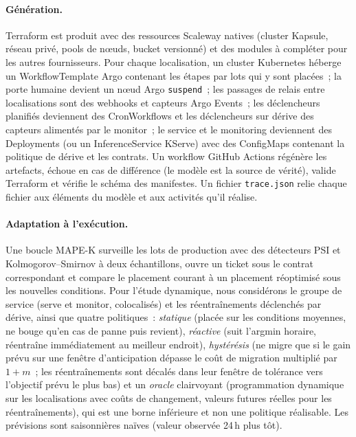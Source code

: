 \documentclass[10pt,a4paper]{article}
\begin{document}
\paragraph{Génération.} Terraform est produit avec des ressources Scaleway natives
(cluster Kapsule, réseau privé, pools de nœuds, bucket versionné) et des modules à
compléter pour les autres fournisseurs. Pour chaque localisation, un cluster
Kubernetes héberge un WorkflowTemplate Argo contenant les étapes par lots qui y sont
placées~; la porte humaine devient un nœud Argo \texttt{suspend}~; les passages de
relais entre localisations sont des webhooks et capteurs Argo Events~; les
déclencheurs planifiés deviennent des CronWorkflows et les déclencheurs sur dérive des
capteurs alimentés par le monitor~; le service et le monitoring deviennent des
Deployments (ou un InferenceService KServe) avec des ConfigMaps contenant la
politique de dérive et les contrats. Un workflow GitHub Actions régénère les
artefacts, échoue en cas de différence (le modèle est la source de vérité), valide
Terraform et vérifie le schéma des manifestes. Un fichier \texttt{trace.json} relie
chaque fichier aux éléments du modèle et aux activités qu'il réalise.

\paragraph{Adaptation à l'exécution.} Une boucle MAPE-K surveille les lots de
production avec des détecteurs PSI et Kolmogorov--Smirnov à deux échantillons, ouvre
un ticket sous le contrat correspondant et compare le placement courant à un placement
réoptimisé sous les nouvelles conditions. Pour l'étude dynamique, nous considérons le
groupe de service (serve et monitor, colocalisés) et les réentraînements déclenchés par
dérive, ainsi que quatre politiques~: \emph{statique} (placée sur les conditions
moyennes, ne bouge qu'en cas de panne puis revient), \emph{réactive} (suit l'argmin
horaire, réentraîne immédiatement au meilleur endroit), \emph{hystérésis} (ne migre que
si le gain prévu sur une fenêtre d'anticipation dépasse le coût de migration multiplié
par \(1+m\)~; les réentraînements sont décalés dans leur fenêtre de tolérance vers
l'objectif prévu le plus bas) et un \emph{oracle} clairvoyant (programmation dynamique
sur les localisations avec coûts de changement, valeurs futures réelles pour les
réentraînements), qui est une borne inférieure et non une politique réalisable. Les
prévisions sont saisonnières naïves (valeur observée 24\,h plus tôt).
\end{document}
